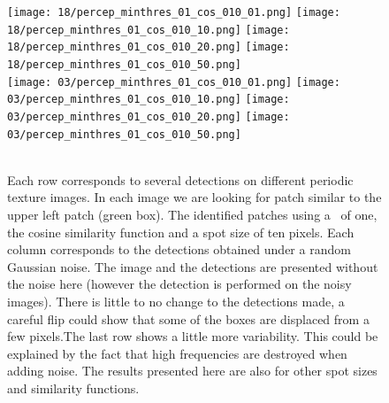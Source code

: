 \begin{figure}[H]
  \centering
  {\texttt{[image: 18/percep\_minthres\_01\_cos\_010\_01.png]}} \hfill
  {\texttt{[image: 18/percep\_minthres\_01\_cos\_010\_10.png]}} \hfill
  {\texttt{[image: 18/percep\_minthres\_01\_cos\_010\_20.png]}} \hfill  
  {\texttt{[image: 18/percep\_minthres\_01\_cos\_010\_50.png]}} \hfill \\
  {\texttt{[image: 03/percep\_minthres\_01\_cos\_010\_01.png]}} \hfill
  {\texttt{[image: 03/percep\_minthres\_01\_cos\_010\_10.png]}} \hfill
  {\texttt{[image: 03/percep\_minthres\_01\_cos\_010\_20.png]}} \hfill  
  {\texttt{[image: 03/percep\_minthres\_01\_cos\_010\_50.png]}} \hfill \\
   \hfill
   \hfill
   \hfill  
   \hfill \\
  \caption{Each row corresponds to several detections on different periodic texture images. In each image we are looking for patch similar to the upper left patch (green box). The identified patches using a \NFA \ of one, the cosine similarity function and a spot size of ten pixels. Each column corresponds to the detections obtained under a random Gaussian noise. The image and the detections are presented without the noise here (however the detection is performed on the noisy images). There is little to no change to the detections made, a careful flip could show that some of the boxes are displaced from a few pixels.The last row shows a little more variability. This could be explained by the fact that high frequencies are destroyed when adding noise. The results presented here are also for other spot sizes and similarity functions.}
  \label{f:robustness_noise}
\end{figure}
